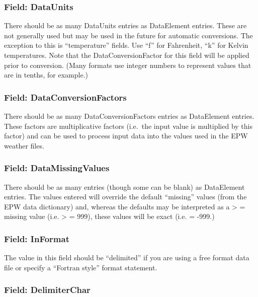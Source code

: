 \subsubsection{Field: DataUnits}\label{field-dataunits}

There should be as many DataUnits entries as DataElement entries. These are not generally used but may be used in the future for automatic conversions. The exception to this is ``temperature'' fields. Use ``f'' for Fahrenheit, ``k'' for Kelvin temperatures. Note that the DataConversionFactor for this field will be applied prior to conversion. (Many formats use integer numbers to represent values that are in tenths, for example.)

\subsubsection{Field: DataConversionFactors}\label{field-dataconversionfactors}

There should be as many DataConversionFactors entries as DataElement entries. These factors are multiplicative factors (i.e.~the input value is multiplied by this factor) and can be used to process input data into the values used in the EPW weather files.

\subsubsection{Field: DataMissingValues}\label{field-datamissingvalues}

There should be as many entries (though some can be blank) as DataElement entries. The values entered will override the default ``missing'' values (from the EPW data dictionary) and, whereas the defaults may be interpreted as a \textgreater{} = missing value (i.e. \textgreater{} = 999), these values will be exact (i.e. = -999.)

\subsubsection{Field: InFormat}\label{field-informat}

The value in this field should be ``delimited'' if you are using a free format data file or specify a ``Fortran style'' format statement.

\subsubsection{Field: DelimiterChar}\label{field-delimiterchar}

